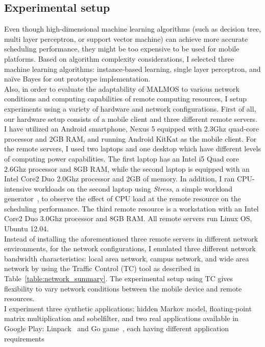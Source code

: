 {{\subsection{Experimental setup}
\label{online:setup}
Even though high-dimensional machine learning algorithms (such as
decision tree, multi layer perceptron, or support vector machine) can
achieve more accurate scheduling performance, they might be too
expensive to be used for mobile platforms.
%
Based on algorithm complexity considerations, I selected three machine learning
algorithms: instance-based learning, single layer perceptron, and
na\"{i}ve Bayes for out prototype implementation.\\
%
Also, in order to evaluate the adaptability of MALMOS to various
network conditions and computing capabilities of remote computing
resources, I setup experiments using a variety of hardware and
network configurations.
%
First of all, our hardware setup consists of a mobile client and three
different remote servers.
%
I have utilized an Android smartphone, Nexus 5 equipped with 2.3Ghz
quad-core processor and 2GB RAM, and running Android KitKat as the
mobile client.
%
For the remote servers, I used two laptops and one desktop which have
different levels of computing power capabilities.
%
The first laptop has an Intel i5 Quad core 2.6Ghz processor and 8GB RAM, while
the second laptop is equipped with an Intel Core2 Duo 2.0Ghz processor and 2GB
of memory.
%
In addition, I ran CPU-intensive workloads on the second laptop using
\textit{Stress}, a simple workload generator~\cite{stress}, to observe 
the effect of CPU load at the remote resource on the scheduling performance.
%
The third remote resource is a workstation with an Intel Core2 Duo 3.0Ghz processor
and 8GB RAM.
%
All remote servers run Linux OS, Ubuntu 12.04.\\
%
Instead of installing the aforementioned three remote servers in
different network environments, for the network configurations, I
emulated three different network bandwidth characteristics: local area
network, campus network, and wide area network by using the Traffic
Control (TC) tool as described in Table~\ref{table:network_summary}.
%
The experimental setup using TC gives flexibility to vary network
conditions between the mobile device and remote resources.\\
%
I experiment three synthetic applications: hidden Markov
model, floating-point matrix multiplication and sobelfilter, and two real
applications available in Google Play: Linpack~\cite{linpack} and 
Go game~\cite{go}, each having different application requirements 
}}
